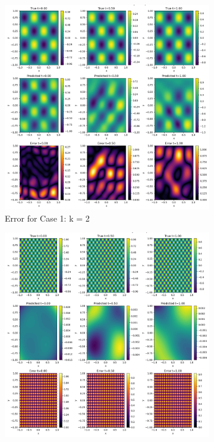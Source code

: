 \documentclass[11pt]{article}
\begin{document}
\begin{figure}[h!]
    \centering
    \begin{subfigure}[b]{0.48\textwidth}
        \includegraphics[width=\textwidth]{2D_Error_K1_Rowdy.png}
        \caption{Error for Case 1: k = 2}
        \label{fig:Error_K1_Rowdy}
    \end{subfigure}
    \hfill
    \begin{subfigure}[b]{0.48\textwidth}
        \includegraphics[width=\textwidth]{2D_Error_K2_Rowdy.png}

\end{subfigure}
\end{figure}
\end{document}

